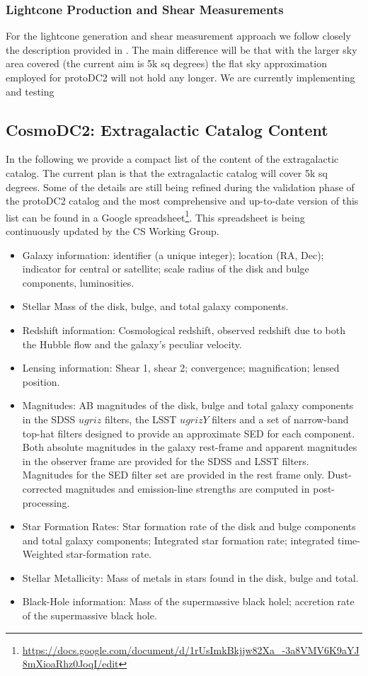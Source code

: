 \documentclass[preprint,times]{aastex61}
\begin{document}
\subsubsection{Lightcone Production and Shear Measurements}

For the lightcone generation and shear measurement approach we follow closely the description provided in \cite{protoDC2}. The main difference will be that with the larger sky area covered (the current aim is 5k sq degrees) the flat sky approximation employed for protoDC2 will not hold any longer. We are currently implementing and testing 

\subsection{CosmoDC2: Extragalactic Catalog Content}

In the following we provide a compact list of the content of the extragalactic catalog. The current plan is that the extragalactic catalog will cover 5k sq degrees. Some of the details are still being refined during the validation phase of the protoDC2 catalog and the most comprehensive and up-to-date version of this list can be found in a Google  spreadsheet\footnote{\url{https://docs.google.com/document/d/1rUsImkBkjjw82Xa_-3a8VMV6K9aYJ8mXioaRhz0JoqI/edit}}. This spreadsheet is being continuously updated by the CS Working Group. 


\begin{itemize}
\item Galaxy information: identifier (a unique integer); location (RA, Dec); indicator for central or satellite; scale radius of the disk and bulge components, luminosities.
\item    Stellar Mass of the disk, bulge, and total galaxy components.
\item Redshift information: Cosmological redshift, observed redshift due to both the Hubble flow and the galaxy's peculiar velocity.
\item Lensing information: Shear 1, shear 2; convergence; magnification; lensed position.
\item    Magnitudes: AB magnitudes of the disk, bulge and total galaxy components in the SDSS $ugriz$ filters, the LSST $ugrizY$ filters and a set of narrow-band top-hat filters designed to provide an approximate SED for each component.  Both absolute magnitudes in the galaxy rest-frame and apparent magnitudes in the observer frame are provided for the SDSS and LSST filters. Magnitudes for the SED filter set are provided in the rest frame only.
Dust-corrected magnitudes and emission-line strengths are computed in post-processing.
\item    Star Formation Rates: Star formation rate of the disk and bulge components and total galaxy components; 
Integrated star formation rate; integrated time-Weighted star-formation rate.
\item  Stellar Metallicity: Mass of metals in stars found in the disk, bulge and total. 
\item    Black-Hole information: Mass of the supermassive black holel; accretion rate of the supermassive black hole. 
\end{itemize}
 
\end{document}
